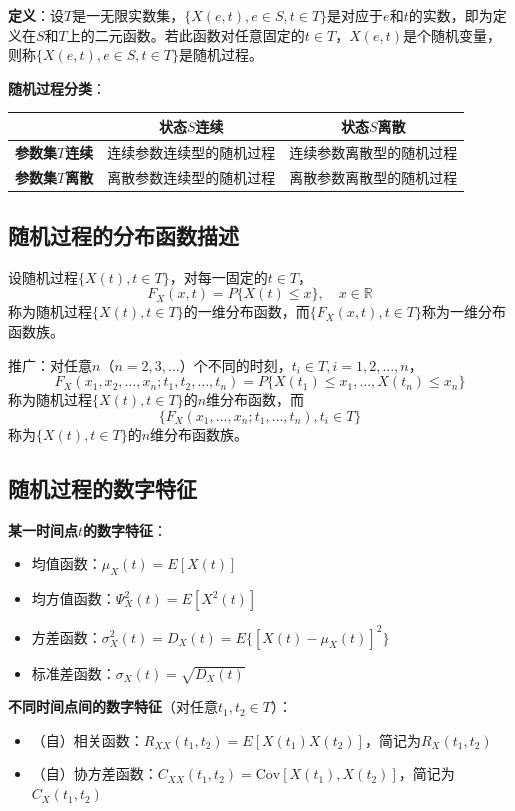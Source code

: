\documentclass[11pt,a4paper]{report}
\theoremstyle{definition}
\begin{document}
\textbf{定义}：设$T$是一无限实数集，$\{X(e,t),e\in S,t\in T\}$是对应于$e$和$t$的实数，即为定义在$S$和$T$上的二元函数。若此函数对任意固定的$t\in T$，$X(e,t)$是个随机变量，则称$\{X(e,t),e\in S,t\in T\}$是随机过程。

\textbf{随机过程分类}：

\begin{table}[htbp]
\centering
\begin{tabular}{@{}ccc@{}}
\toprule
& \textbf{状态$S$连续} & \textbf{状态$S$离散} \\
\midrule
\textbf{参数集$T$连续} & 连续参数连续型的随机过程 & 连续参数离散型的随机过程 \\
\textbf{参数集$T$离散} & 离散参数连续型的随机过程 & 离散参数离散型的随机过程 \\
\bottomrule
\end{tabular}
\end{table}

\subsection*{随机过程的分布函数描述}

设随机过程$\{X(t),t\in T\}$，对每一固定的$t\in T$，
\[
F_X(x,t)=P\{X(t)\leq x\},\quad x\in\mathbb{R}
\]
称为随机过程$\{X(t),t\in T\}$的一维分布函数，而$\{F_X(x,t),t\in T\}$称为一维分布函数族。

推广：对任意$n$（$n=2,3,\ldots$）个不同的时刻，$t_i\in T,i=1,2,\ldots,n$，
\[
F_X(x_1,x_2,\ldots,x_n;t_1,t_2,\ldots,t_n)=P\{X(t_1)\leq x_1,\ldots,X(t_n)\leq x_n\}
\]
称为随机过程$\{X(t),t\in T\}$的$n$维分布函数，而
\[
\{F_X(x_1,\ldots,x_n;t_1,\ldots,t_n),t_i\in T\}
\]
称为$\{X(t),t\in T\}$的$n$维分布函数族。

\subsection*{随机过程的数字特征}

\textbf{某一时间点$t$的数字特征}：
\begin{itemize}[leftmargin=2em]
    \item 均值函数：$\mu_X(t)=E[X(t)]$
    \item 均方值函数：$\Psi_X^2(t)=E[X^2(t)]$
    \item 方差函数：$\sigma_X^2(t)=D_X(t)=E\{[X(t)-\mu_X(t)]^2\}$
    \item 标准差函数：$\sigma_X(t)=\sqrt{D_X(t)}$
\end{itemize}

\textbf{不同时间点间的数字特征}（对任意$t_1,t_2\in T$）：
\begin{itemize}[leftmargin=2em]
    \item （自）相关函数：$R_{XX}(t_1,t_2)=E[X(t_1)X(t_2)]$，简记为$R_X(t_1,t_2)$
    \item （自）协方差函数：$C_{XX}(t_1,t_2)=\mathrm{Cov}[X(t_1),X(t_2)]$，简记为$C_X(t_1,t_2)$
\end{itemize}
\end{document}
